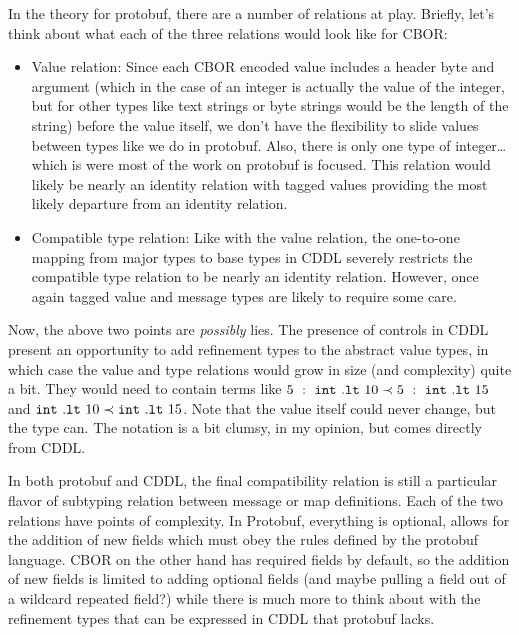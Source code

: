 \documentclass[../pollux.tex]{subfiles}
\begin{document}
In the theory for protobuf, there are a number of relations at play. Briefly,
let's think about what each of the three relations would look like for CBOR:

\begin{itemize}
\item Value relation: Since each CBOR encoded value includes a header byte and
  argument (which in the case of an integer is actually the value of the
  integer, but for other types like text strings or byte strings would be the
  length of the string) before the value itself, we don't have the flexibility
  to slide values between types like we do in protobuf. Also, there is only one
  type of integer\ldots which is were most of the work on protobuf is focused. This
  relation would likely be nearly an identity relation with tagged values
  providing the most likely departure from an identity relation.
\item Compatible type relation: Like with the value relation, the one-to-one
  mapping from major types to base types in CDDL severely restricts the
  compatible type relation to be nearly an identity relation. However, once
  again tagged value and message types are likely to require some care.
\end{itemize}

Now, the above two points are \emph{possibly} lies. The presence of controls in
CDDL present an opportunity to add refinement types to the abstract value types,
in which case the value and type relations would grow in size (and complexity)
quite a bit. They would need to contain terms like
$5\ :\ \mathtt{int}\ .\mathtt{lt}\ 10 \valrel 5\ :\ \mathtt{int}\ .\mathtt{lt}\ 15$ and
$\mathtt{int}\ \mathtt{.lt}\ 10 \prec \mathtt{int}\ \mathtt{.lt}\ 15$. Note that
the value itself could never change, but the type can. The notation is a bit
clumsy, in my opinion, but comes directly from CDDL.

In both protobuf and CDDL, the final compatibility relation is still a
particular flavor of subtyping relation between message or map definitions. Each
of the two relations have points of complexity. In Protobuf, everything is
optional, allows for the addition of new fields which must obey the rules
defined by the protobuf language. CBOR on the other hand has required fields by
default, so the addition of new fields is limited to adding optional fields (and
maybe pulling a field out of a wildcard repeated field?) while there is much
more to think about with the refinement types that can be expressed in CDDL that
protobuf lacks.
\end{document}
